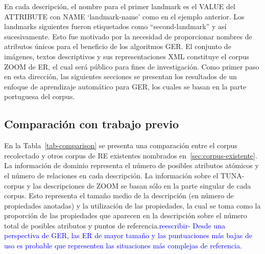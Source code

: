 
En cada descripci\'on, el nombre para el primer landmark es el VALUE del ATTRIBUTE con NAME `landmark-name' como en el ejemplo anterior. Los landmarks siguientes fueron etiquetados como ``second-landmark'' y as\'{i} sucesivamente. Esto fue motivado por la necesidad de proporcionar nombres de atributos \'unicos para el beneficio de los algoritmos GER.
El conjunto de im\'agenes, textos descriptivos y sus representaciones XML constituye el corpus ZOOM de ER, el cual ser\'a p\'ublico para fines de investigaci\'on. Como primer paso en esta direcci\'on, las siguientes secciones se presentan los resultados de un enfoque de aprendizaje autom\'atico para GER, los cuales se basan en la parte portuguesa del corpus.

\subsection{Comparaci\'on con trabajo previo}
\label{sec:comparacion_trabajo_previo}

En la Tabla~\ref{tab-comparison} se presenta una comparaci\'on entre el corpus recolectado y otros corpus de RE existentes nombrados en~\ref{sec:corpus-existente}. La informaci\'on de dominio representa el n\'umero de posibles atributos at\'omicos y el n\'umero de relaciones en cada descripci\'on. La informaci\'on sobre el TUNA-corpus y las descripciones de ZOOM se basan s\'olo en la parte singular de cada corpus. Esto representa el tama\~no medio de la descripci\'on (en n\'umero de propiedades anotadas) y la utilizaci\'on de las propiedades, la cual se toma como la proporci\'on de las propiedades que aparecen en la descripci\'on sobre el n\'umero total de posibles atributos y puntos de referencia.\textcolor{blue}{reescribir- Desde una perspectiva de GER, las ER de mayor tama\~no y las puntuaciones m\'as bajas de uso es probable que representen las situaciones m\'as complejas de referencia.}


